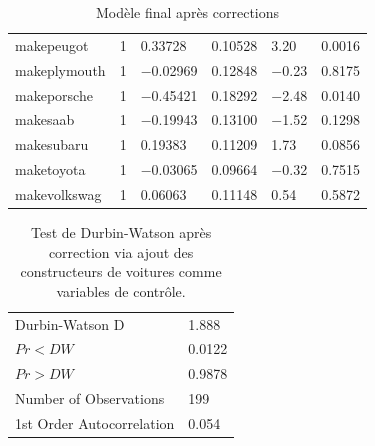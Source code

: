 \documentclass[11pt,a4paper]{article}
\begin{document}
\begin{table}
\begin{tabulary}{1\textwidth}{LLLLLL}
	makepeugot &       1 &    0.33728 &    0.10528 &    3.20 &    0.0016\\
	makeplymouth &      1 &    $-$0.02969 &    0.12848 &    $-$0.23 &    0.8175\\
	makeporsche &        1 &    $-$0.45421 &    0.18292 &    $-$2.48 &    0.0140\\
	makesaab &       1 &    $-$0.19943 &    0.13100 &    $-$1.52 &    0.1298\\
	makesubaru &       1 &    0.19383 &    0.11209 &    1.73 &    0.0856\\
	maketoyota &       1 &    $-$0.03065 &    0.09664 &    $-$0.32 &    0.7515\\
	makevolkswag &        1 &    0.06063 &    0.11148 &    0.54 &    0.5872\\\hline
\end{tabulary}
	\caption{Modèle final après corrections}
	\label{table:Modfinal}
\end{table}

\begin{table}
	\scriptsize
	\centering
	\begin{tabulary}{1\textwidth}{LL}\hline
		Durbin-Watson D &    1.888\\
		$Pr < DW$ &    0.0122\\
		$Pr > DW$ &    0.9878\\
		Number of Observations &    199\\
		1st Order Autocorrelation &    0.054\\\hline
	\end{tabulary}
	\caption{Test de Durbin-Watson après correction via ajout des constructeurs de voitures comme variables de contrôle.}
	\label{table:dwcorrected}
\end{table}
\end{document}
